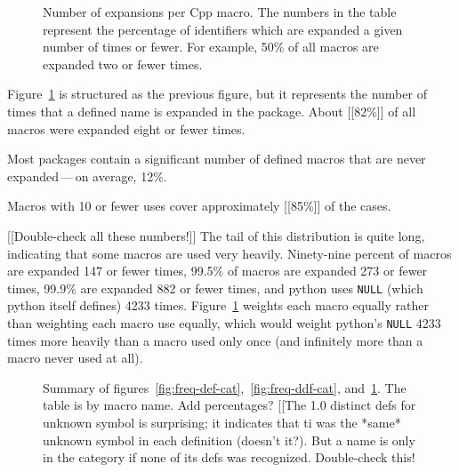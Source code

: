 \documentclass[10pt]{article}
\newcommand{\pkg}[1]{\textsf{#1}}
\begin{document}


\begin{figure}
\centerline{}
\caption{Number of expansions per Cpp macro.  The numbers in the
  table represent the percentage of identifiers which are expanded a given
  number of times or fewer.  For example, 50\% of all
  macros are expanded two or fewer times.}
\label{fig:freq-use-cat}
\end{figure}

Figure~\ref{fig:freq-use-cat} is structured as the previous figure, but it
represents the number of times that a defined name is expanded in 
the package.  About [[82\%]] of all macros were
expanded eight or fewer times.

Most packages contain a significant number of defined
macros that are never expanded\,---\,on average, 12\%.

Macros with 10 or fewer uses
cover approximately [[85\%]] of the cases.

[[Double-check all these numbers!]]
The tail of this distribution is quite long, indicating that some macros
are used very heavily.  Ninety-nine percent of macros are expanded 147 or fewer
times, 99.5\% of macros are expanded 273 or fewer times, 99.9\% are
expanded 882 or fewer times, and \pkg{python} uses {\tt NULL} (which \pkg{python}
itself defines) 4233 times.  Figure~\ref{fig:freq-use-cat} weights each macro
equally rather than weighting each macro use equally, which would weight
\pkg{python}'s {\tt NULL} 4233 times more heavily than a macro used only once
(and infinitely more than a macro never used at all).

\begin{figure}
  {\small\centerline{}}
  
  \caption{Summary of
    figures~\ref{fig:freq-def-cat},~\ref{fig:freq-ddf-cat},
    and~\ref{fig:freq-use-cat}.  The table is by macro name.  Add percentages?
    [[The 1.0 distinct defs for unknown symbol is surprising; it indicates
    that ti was the *same* unknown symbol in each definition (doesn't
    it?).  But a name is only in the category if none of its defs was
    recognized.  Double-check this!}
  \label{fig:freq-sum-cat}
\end{figure}
\end{document}
